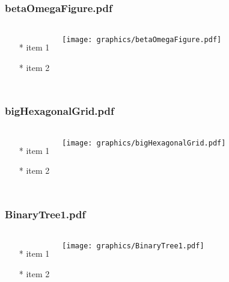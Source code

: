 \begin{frame} \frametitle{betaOmegaFigure.pdf}
    \begin{columns}[c]
        \begin{itemize}
            \item[*] item 1
            \item[*] item 2
        \end{itemize}
        \begin{minipage}{\linewidth}
            \begin{center}
            \texttt{[image: graphics/betaOmegaFigure.pdf]}
            \label{gfx:betaOmegaFigure.pdf}
            \end{center}
        \end{minipage}
    \end{columns}
\end{frame}
\begin{frame} \frametitle{bigHexagonalGrid.pdf}
    \begin{columns}[c]
        \begin{itemize}
            \item[*] item 1
            \item[*] item 2
        \end{itemize}
        \begin{minipage}{\linewidth}
            \begin{center}
            \texttt{[image: graphics/bigHexagonalGrid.pdf]}
            \label{gfx:bigHexagonalGrid.pdf}
            \end{center}
        \end{minipage}
    \end{columns}
\end{frame}
\begin{frame} \frametitle{BinaryTree1.pdf}
    \begin{columns}[c]
        \begin{itemize}
            \item[*] item 1
            \item[*] item 2
        \end{itemize}
        \begin{minipage}{\linewidth}
            \begin{center}
            \texttt{[image: graphics/BinaryTree1.pdf]}
            \label{gfx:BinaryTree1.pdf}
            \end{center}
        \end{minipage}
    \end{columns}
\end{frame}
